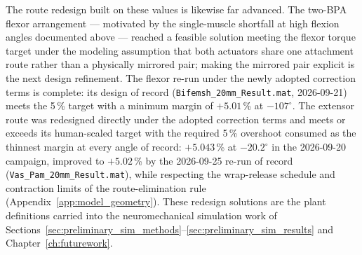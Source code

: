 The route redesign built on these values is likewise far advanced. The two-BPA flexor arrangement --- motivated by the single-muscle shortfall at high flexion angles documented above --- reached a feasible solution meeting the flexor torque target under the modeling assumption that both actuators share one attachment route rather than a physically mirrored pair; making the mirrored pair explicit is the next design refinement. The flexor re-run under the newly adopted correction terms is complete: its design of record (\texttt{Bifemsh\_20mm\_Result.mat}, 2026-09-21) meets the 5\,\% target with a minimum margin of $+5.01$\,\% at $-107^{\circ}$. The extensor route was redesigned directly under the adopted correction terms and meets or exceeds its human-scaled target with the required 5\,\% overshoot consumed as the thinnest margin at every angle of record: $+5.043$\,\% at $-20.2^{\circ}$ in the 2026-09-20 campaign, improved to $+5.02$\,\% by the 2026-09-25 re-run of record (\texttt{Vas\_Pam\_20mm\_Result.mat}), while respecting the wrap-release schedule and contraction limits of the route-elimination rule (Appendix~\ref{app:model_geometry}). These redesign solutions are the plant definitions carried into the neuromechanical simulation work of Sections~\ref{sec:preliminary_sim_methods}--\ref{sec:preliminary_sim_results} and Chapter~\ref{ch:futurework}.

